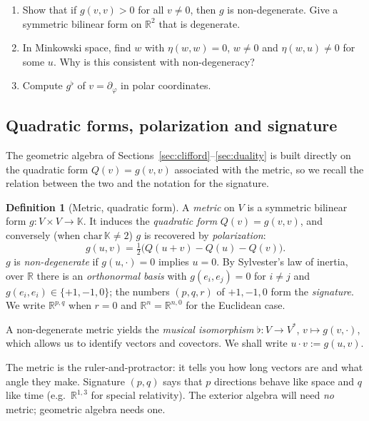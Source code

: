 \documentclass[11pt,a4paper]{article}
\newcounter{thm}[section]
\numberwithin{equation}{section}
\theoremstyle{definition}
\newtheorem{definition}[thm]{Definition}
\theoremstyle{plain}
\newcommand{\R}{\mathbb{R}}
\newcommand{\K}{\mathbb{K}}
\begin{document}
\begin{exercises}
\begin{enumerate}[nosep]
\item Show that if $g(v,v)>0$ for all $v\neq0$, then $g$ is non-degenerate. Give a symmetric bilinear form on $\R^2$ that is degenerate.
\item In Minkowski space, find $w$ with $\eta(w,w)=0$, $w\ne0$ and $\eta(w,u)\neq0$ for some $u$. Why is this consistent with non-degeneracy?
\item Compute $g^\flat$ of $v=\partial_\varphi$ in polar coordinates.
\end{enumerate}
\end{exercises}


\subsection{Quadratic forms, polarization and signature}\label{sec:quadform}
The geometric algebra of Sections~\ref{sec:clifford}--\ref{sec:duality} is built directly on the quadratic form $Q(v)=g(v,v)$
associated with the metric, so we recall the relation between the two and the notation for the signature.
\begin{definition}[Metric, quadratic form]
A \emph{metric} on $V$ is a symmetric bilinear form $g:V\times V\to\K$. It induces the
\emph{quadratic form} $Q(v)=g(v,v)$, and conversely (when $\mathrm{char}\,\K\neq2$) $g$ is
recovered by \emph{polarization}:
\begin{equation}\label{eq:polar}
  g(u,v)=\tfrac12\bigl(Q(u+v)-Q(u)-Q(v)\bigr).
\end{equation}
$g$ is \emph{non-degenerate} if $g(u,\cdot)=0$ implies $u=0$. By Sylvester's law of inertia, over
$\R$ there is an \emph{orthonormal basis} with $g(e_i,e_j)=0$ for $i\neq j$ and
$g(e_i,e_i)\in\{+1,-1,0\}$; the numbers $(p,q,r)$ of $+1,-1,0$ form the \emph{signature}.
We write $\R^{p,q}$ when $r=0$ and $\R^n=\R^{n,0}$ for the Euclidean case.
\end{definition}

A non-degenerate metric yields the \emph{musical isomorphism} $\flat:V\to V^*$,
$v\mapsto g(v,\cdot)$, which allows us to identify vectors and covectors.
We shall write $u\cdot v:=g(u,v)$.

\begin{intuition}
The metric is the ruler-and-protractor: it tells you how long vectors are and what angle they make.
Signature $(p,q)$ says that $p$ directions behave like space and $q$ like time (e.g.\ $\R^{1,3}$ for
special relativity). The exterior algebra will need \emph{no} metric; geometric algebra needs one.
\end{intuition}
\end{document}
